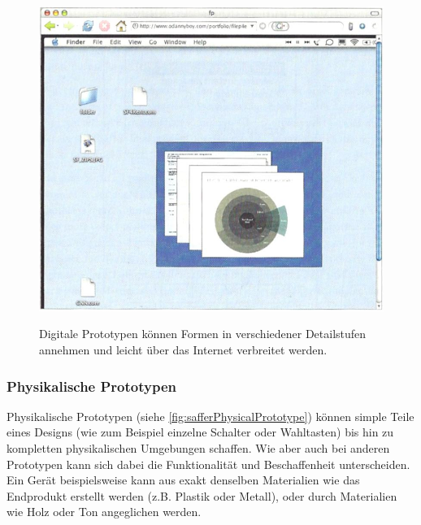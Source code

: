 \begin{figure}
	\begin{center}
        {\includegraphics[width=\linewidth]{gfx/safferDigitalPrototype}}
	\end{center}
		\caption[Digitale Prototypen. \newline \citep{Saffer:2007}]{Digitale Prototypen können Formen in verschiedener Detailstufen annehmen und leicht über das Internet verbreitet werden.}\label{fig:safferDigitalPrototype}
\end{figure}

\subsubsection{Physikalische Prototypen} 
Physikalische Prototypen (siehe \autoref{fig:safferPhysicalPrototype}) können simple Teile eines Designs (wie zum Beispiel einzelne Schalter oder Wahltasten) bis hin zu kompletten physikalischen Umgebungen schaffen. Wie aber auch bei anderen Prototypen kann sich dabei die Funktionalität und Beschaffenheit unterscheiden. Ein Gerät beispielsweise kann aus exakt denselben Materialien wie das Endprodukt erstellt werden (z.B. Plastik oder Metall), oder durch Materialien wie Holz oder Ton angeglichen werden. 

